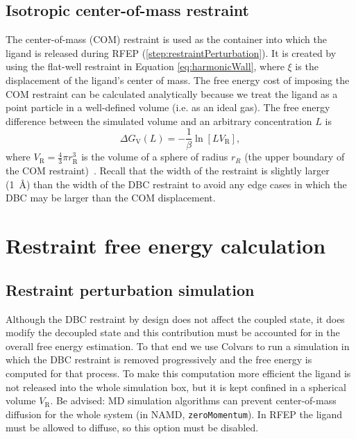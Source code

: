 \documentclass[9pt,tutorial]{Styling/livecoms}
\newcommand{\textInput}[1]{\texttt{#1}}
\begin{document}
\subsection{Isotropic center-of-mass restraint} \label{app:COMCorrection}
The center-of-mass (COM) restraint is used as the container into which the ligand is released during RFEP (\ref{step:restraintPerturbation}). It is created by using the flat-well restraint in Equation \ref{eq:harmonicWall}, where $\xi$ is the displacement of the ligand's center of mass.
The free energy cost of imposing the COM restraint can be calculated analytically because we treat the ligand as a point particle in a well-defined volume (i.e. as an ideal gas).
The free energy difference between the simulated volume and an arbitrary concentration $L$ is
 \begin{equation}\label{eq:dGV}
     \Delta G_\mathrm{V}(L)=-\frac{1}{\beta} \ln [L V_\mathrm{R}],
 \end{equation}
where $V_\mathrm{R}=\frac{4}{3}\pi r_\mathrm{R}^{3}$ is the volume of a sphere of radius $r_R$ (the upper boundary of the COM restraint)~\cite{Salari2018}. 
Recall that the width of the restraint is slightly larger (1~\AA{}) than the width of the DBC restraint to avoid any edge cases in which the DBC may be larger than the COM displacement.

\section{Restraint free energy calculation}\label{app:RFEP}

\subsection{Restraint perturbation simulation}

Although the DBC restraint by design does not affect the coupled state, it does modify the decoupled state and this contribution must be accounted for in the overall free energy estimation. 
To that end we use Colvars to run a simulation in which the DBC restraint is removed progressively and the free energy is computed for that process.
To make this computation more efficient the ligand is not released into the whole simulation box, but it is kept confined in a spherical volume $V_\mathrm{R}$. 
Be advised: MD simulation algorithms can prevent center-of-mass diffusion for the whole system (in NAMD, \textInput{zeroMomentum}).
In RFEP the ligand must be allowed to diffuse, so this option must be disabled.
\end{document}
